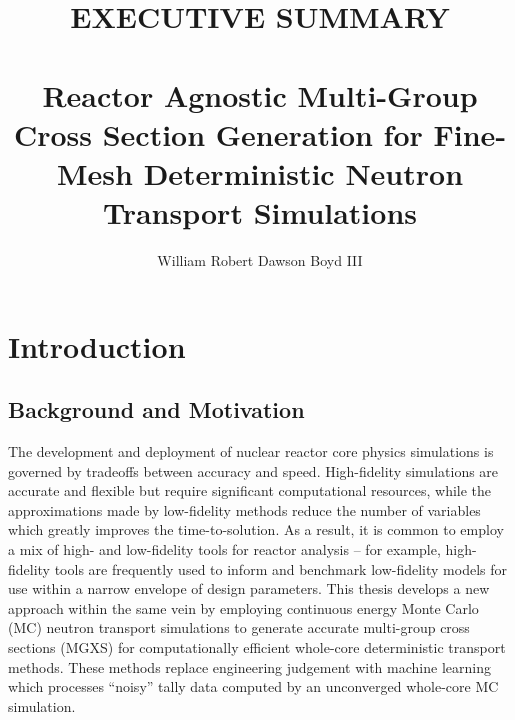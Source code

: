 \documentclass[12pt,twoside]{mitthesis-exec}
\begin{document}



\title{EXECUTIVE SUMMARY \\~\\ Reactor Agnostic Multi-Group Cross Section Generation for Fine-Mesh Deterministic Neutron Transport Simulations}

\author{William Robert Dawson Boyd III}








\singlespacing 

\section*{Introduction}

\subsection*{Background and Motivation}

The development and deployment of nuclear reactor core physics simulations is governed by tradeoffs between accuracy and speed. High-fidelity simulations are accurate and flexible but require significant computational resources, while the approximations made by low-fidelity methods reduce the number of variables which greatly improves the time-to-solution. As a result, it is common to employ a mix of high- and low-fidelity tools for reactor analysis -- for example, high-fidelity tools are frequently used to inform and benchmark low-fidelity models for use within a narrow envelope of design parameters. This thesis develops a new approach within the same vein by employing continuous energy Monte Carlo (MC) neutron transport simulations to generate accurate multi-group cross sections (MGXS) for computationally efficient whole-core deterministic transport methods. These methods replace engineering judgement with machine learning which processes ``noisy'' tally data computed by an unconverged whole-core MC simulation.
\end{document}
